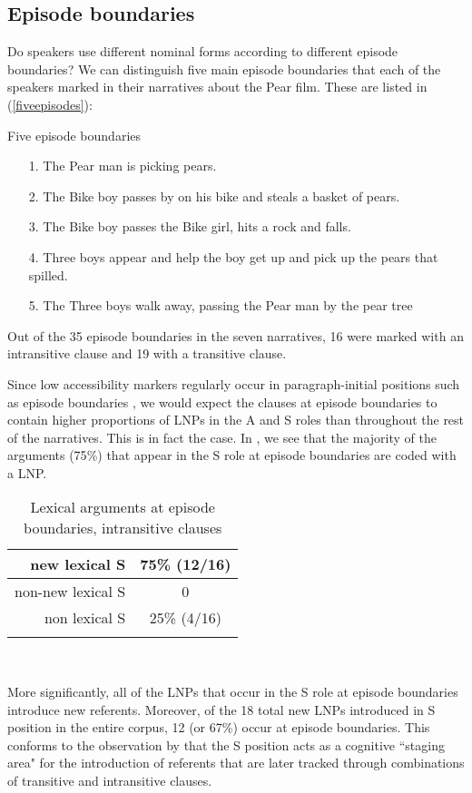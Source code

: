 \subsection{Episode boundaries}\label{episodeboundaries}

Do speakers use different nominal forms according to different episode boundaries? We can distinguish five main episode boundaries that each of the speakers marked in their narratives about the Pear film. These are listed in (\ref{fiveepisodes}):

\ea\label{fiveepisodes} Five episode boundaries
\begin{itemize}
\item[1.] The Pear man is picking pears. 
\item[2.] The Bike boy passes by on his bike and steals a basket of pears. 
\item[3.] The Bike boy passes the Bike girl, hits a rock and falls. 
\item[4.] Three boys appear and help the boy get up and pick up the pears that spilled.
\item[5.] The Three boys walk away, passing the Pear man by the pear tree
\end{itemize}
\z
 Out of the 35 episode boundaries in the seven narratives, 16 were marked with an intransitive clause and 19 with a transitive clause.

Since low accessibility markers regularly occur in paragraph-initial positions such as episode boundaries \citep[52]{ariel2001}, we would expect the clauses at episode boundaries to contain higher proportions of LNPs in the A and S roles than throughout the rest of the narratives. This is in fact the case. In , we see that the majority of the arguments (75{\%}) that appear in the S role at episode boundaries are coded with a LNP. 
\begin{table} 

\caption{{Lexical arguments at episode boundaries, intransitive clauses}}
\begin{tabular}{ r  c }
\lsptoprule
new lexical S & 75{\%} (12/16) \\

\midrule
non-new lexical S & 0 \\

\midrule
non lexical S & 25{\%} (4/16)  \\

\lspbottomrule
\end{tabular}\\
\label{episodeintr}

\end{table}
More significantly, all of the LNPs that occur in the S role at episode boundaries introduce new referents. Moreover, of the 18 total new LNPs introduced in S position in the entire corpus, 12 (or 67{\%}) occur at episode boundaries. This conforms to the observation by \citet[831]{dubois1987} that the S position acts as a cognitive ``staging area" for the introduction of referents that are later tracked through combinations of transitive and intransitive clauses.


